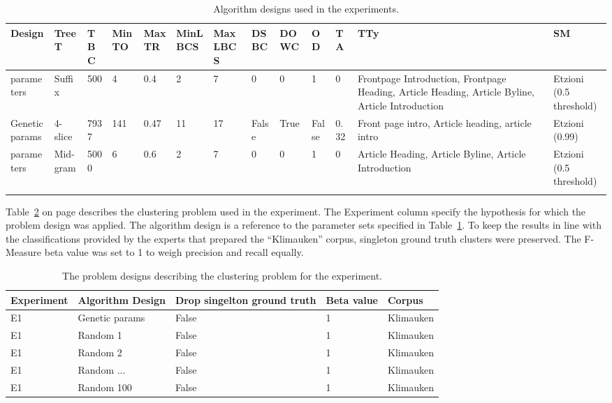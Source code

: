 \begin{landscape}
\begin{center}
\footnotesize
  \begin{longtable}{|p{1.5cm}|p{1.5cm}|p{1cm}|p{1.5cm}|p{1.5cm}|p{1.5cm}|p{1.5cm}|p{1.2cm}|p{1.5cm}|p{0.8cm}|p{1cm}|p{2.5cm}|p{1.5cm}|}
  \hline
  Design & TreeT & TBC & MinTO & MaxTR & MinLBCS & MaxLBCS & DSBC & DOWC & OD & TA & TTy & SM\\
  \hline
  \endhead
  \citeauthor{Oren1998} parameters & Suffix & 500 & 4 & 0.4 & 2 & 7 & 0 & 0 & 1 & 0 & Frontpage Introduction, Frontpage Heading, Article Heading, Article Byline, Article Introduction & Etzioni (0.5 threshold)\\
  \hline
  Genetic params & 4-slice & 7937 & 141 & 0.47 & 11 & 17 & False & True & False & 0.32 & Front page intro, Article heading, article intro & Etzioni (0.99) \\
  \hline
  \citeauthor{Moe2014} parameters & Mid-gram & 5000 & 6 & 0.6 & 2 & 7 & 0 & 0 & 1 & 0 & Article Heading, Article Byline, Article Introduction & Etzioni (0.5 threshold)\\
  \hline
    \caption{Algorithm designs used in the experiments.}
	\label{tab:algorithmdesign}
  \end{longtable}
\end{center}
\end{landscape}

Table~\ref{tab:problemdesign} on page \pageref{tab:problemdesign} describes the clustering problem used in the experiment. The Experiment column specify the hypothesis for which the problem design was applied. The algorithm design is a reference to the parameter sets specified in Table~\ref{tab:algorithmdesign}. To keep the results in line with the classifications provided by the experts that prepared the ``Klimauken'' corpus, singleton ground truth clusters were preserved. The F-Measure beta value was set to 1 to weigh precision and recall equally.

\begin{table}
\small
\begin{center}
  \begin{tabular}{|l|p{2.5cm}|l|l|l|}
  \hline
  Experiment & Algorithm Design & Drop singelton ground truth & Beta value & Corpus\\ 
  \hline
  E1 & Genetic params & False & 1 & Klimauken\\
  \hline
  E1 & Random 1 & False & 1 & Klimauken\\
  \hline
  E1 & Random 2 & False & 1 & Klimauken\\
  \hline
  E1 & Random ... & False & 1 & Klimauken\\
  \hline
  E1 & Random 100 & False & 1 & Klimauken\\
  \hline
  \end{tabular}
\end{center}
\caption{The problem designs describing the clustering problem for the experiment.}
\label{tab:problemdesign}
\end{table}

